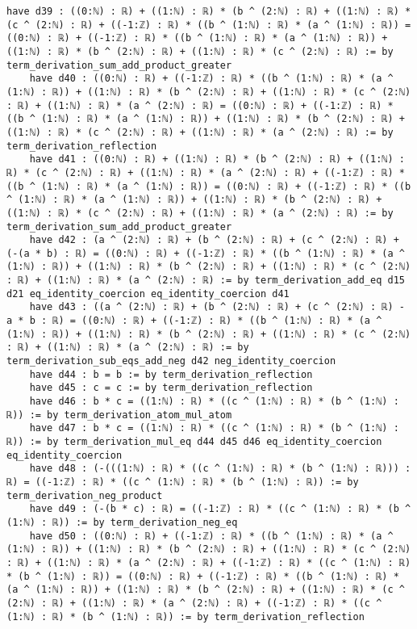 \documentclass{article}
\begin{document}
\begin{tcolorbox}[colback=white!10, width=\linewidth]
\begin{lstlisting}[language=Lean4]
    have d39 : ((0:ℕ) : ℝ) + ((1:ℕ) : ℝ) * (b ^ (2:ℕ) : ℝ) + ((1:ℕ) : ℝ) * (c ^ (2:ℕ) : ℝ) + ((-1:ℤ) : ℝ) * ((b ^ (1:ℕ) : ℝ) * (a ^ (1:ℕ) : ℝ)) = ((0:ℕ) : ℝ) + ((-1:ℤ) : ℝ) * ((b ^ (1:ℕ) : ℝ) * (a ^ (1:ℕ) : ℝ)) + ((1:ℕ) : ℝ) * (b ^ (2:ℕ) : ℝ) + ((1:ℕ) : ℝ) * (c ^ (2:ℕ) : ℝ) := by term_derivation_sum_add_product_greater
    have d40 : ((0:ℕ) : ℝ) + ((-1:ℤ) : ℝ) * ((b ^ (1:ℕ) : ℝ) * (a ^ (1:ℕ) : ℝ)) + ((1:ℕ) : ℝ) * (b ^ (2:ℕ) : ℝ) + ((1:ℕ) : ℝ) * (c ^ (2:ℕ) : ℝ) + ((1:ℕ) : ℝ) * (a ^ (2:ℕ) : ℝ) = ((0:ℕ) : ℝ) + ((-1:ℤ) : ℝ) * ((b ^ (1:ℕ) : ℝ) * (a ^ (1:ℕ) : ℝ)) + ((1:ℕ) : ℝ) * (b ^ (2:ℕ) : ℝ) + ((1:ℕ) : ℝ) * (c ^ (2:ℕ) : ℝ) + ((1:ℕ) : ℝ) * (a ^ (2:ℕ) : ℝ) := by term_derivation_reflection
    have d41 : ((0:ℕ) : ℝ) + ((1:ℕ) : ℝ) * (b ^ (2:ℕ) : ℝ) + ((1:ℕ) : ℝ) * (c ^ (2:ℕ) : ℝ) + ((1:ℕ) : ℝ) * (a ^ (2:ℕ) : ℝ) + ((-1:ℤ) : ℝ) * ((b ^ (1:ℕ) : ℝ) * (a ^ (1:ℕ) : ℝ)) = ((0:ℕ) : ℝ) + ((-1:ℤ) : ℝ) * ((b ^ (1:ℕ) : ℝ) * (a ^ (1:ℕ) : ℝ)) + ((1:ℕ) : ℝ) * (b ^ (2:ℕ) : ℝ) + ((1:ℕ) : ℝ) * (c ^ (2:ℕ) : ℝ) + ((1:ℕ) : ℝ) * (a ^ (2:ℕ) : ℝ) := by term_derivation_sum_add_product_greater
    have d42 : (a ^ (2:ℕ) : ℝ) + (b ^ (2:ℕ) : ℝ) + (c ^ (2:ℕ) : ℝ) + (-(a * b) : ℝ) = ((0:ℕ) : ℝ) + ((-1:ℤ) : ℝ) * ((b ^ (1:ℕ) : ℝ) * (a ^ (1:ℕ) : ℝ)) + ((1:ℕ) : ℝ) * (b ^ (2:ℕ) : ℝ) + ((1:ℕ) : ℝ) * (c ^ (2:ℕ) : ℝ) + ((1:ℕ) : ℝ) * (a ^ (2:ℕ) : ℝ) := by term_derivation_add_eq d15 d21 eq_identity_coercion eq_identity_coercion d41
    have d43 : ((a ^ (2:ℕ) : ℝ) + (b ^ (2:ℕ) : ℝ) + (c ^ (2:ℕ) : ℝ) - a * b : ℝ) = ((0:ℕ) : ℝ) + ((-1:ℤ) : ℝ) * ((b ^ (1:ℕ) : ℝ) * (a ^ (1:ℕ) : ℝ)) + ((1:ℕ) : ℝ) * (b ^ (2:ℕ) : ℝ) + ((1:ℕ) : ℝ) * (c ^ (2:ℕ) : ℝ) + ((1:ℕ) : ℝ) * (a ^ (2:ℕ) : ℝ) := by term_derivation_sub_eqs_add_neg d42 neg_identity_coercion
    have d44 : b = b := by term_derivation_reflection
    have d45 : c = c := by term_derivation_reflection
    have d46 : b * c = ((1:ℕ) : ℝ) * ((c ^ (1:ℕ) : ℝ) * (b ^ (1:ℕ) : ℝ)) := by term_derivation_atom_mul_atom
    have d47 : b * c = ((1:ℕ) : ℝ) * ((c ^ (1:ℕ) : ℝ) * (b ^ (1:ℕ) : ℝ)) := by term_derivation_mul_eq d44 d45 d46 eq_identity_coercion eq_identity_coercion
    have d48 : (-(((1:ℕ) : ℝ) * ((c ^ (1:ℕ) : ℝ) * (b ^ (1:ℕ) : ℝ))) : ℝ) = ((-1:ℤ) : ℝ) * ((c ^ (1:ℕ) : ℝ) * (b ^ (1:ℕ) : ℝ)) := by term_derivation_neg_product
    have d49 : (-(b * c) : ℝ) = ((-1:ℤ) : ℝ) * ((c ^ (1:ℕ) : ℝ) * (b ^ (1:ℕ) : ℝ)) := by term_derivation_neg_eq
    have d50 : ((0:ℕ) : ℝ) + ((-1:ℤ) : ℝ) * ((b ^ (1:ℕ) : ℝ) * (a ^ (1:ℕ) : ℝ)) + ((1:ℕ) : ℝ) * (b ^ (2:ℕ) : ℝ) + ((1:ℕ) : ℝ) * (c ^ (2:ℕ) : ℝ) + ((1:ℕ) : ℝ) * (a ^ (2:ℕ) : ℝ) + ((-1:ℤ) : ℝ) * ((c ^ (1:ℕ) : ℝ) * (b ^ (1:ℕ) : ℝ)) = ((0:ℕ) : ℝ) + ((-1:ℤ) : ℝ) * ((b ^ (1:ℕ) : ℝ) * (a ^ (1:ℕ) : ℝ)) + ((1:ℕ) : ℝ) * (b ^ (2:ℕ) : ℝ) + ((1:ℕ) : ℝ) * (c ^ (2:ℕ) : ℝ) + ((1:ℕ) : ℝ) * (a ^ (2:ℕ) : ℝ) + ((-1:ℤ) : ℝ) * ((c ^ (1:ℕ) : ℝ) * (b ^ (1:ℕ) : ℝ)) := by term_derivation_reflection

\end{lstlisting}
\end{tcolorbox}
\end{document}
